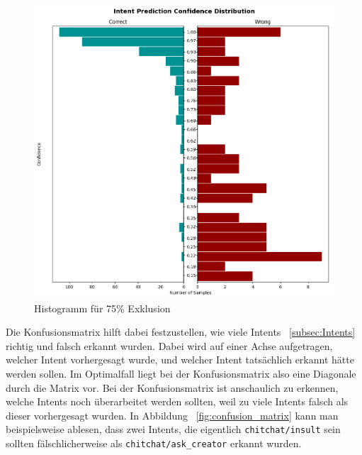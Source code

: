 \begin{figure}[hbt!]
    \centering
    \includegraphics[scale=0.5]{pics/intent_histogram_75}
    \caption{Histogramm für 75\% Exklusion}
    \label{fig:histogram_75}
\end{figure}

Die Konfusionsmatrix hilft dabei festzustellen, wie viele Intents ~\ref{subsec:Intents} richtig und falsch erkannt wurden.
Dabei wird auf einer Achse aufgetragen, welcher Intent vorhergesagt wurde, und welcher Intent tatsächlich erkannt hätte werden sollen.
Im Optimalfall liegt bei der Konfusionsmatrix also eine Diagonale durch die Matrix vor.
Bei der Konfusionsmatrix ist anschaulich zu erkennen, welche Intents noch überarbeitet werden sollten, weil zu viele Intents falsch als dieser vorhergesagt wurden.
In Abbildung ~\ref{fig:confusion_matrix} kann man beispielsweise ablesen, dass zwei Intents, die eigentlich \texttt{chitchat/insult} sein sollten fälschlicherweise als \texttt{chitchat/ask\_creator} erkannt wurden.

